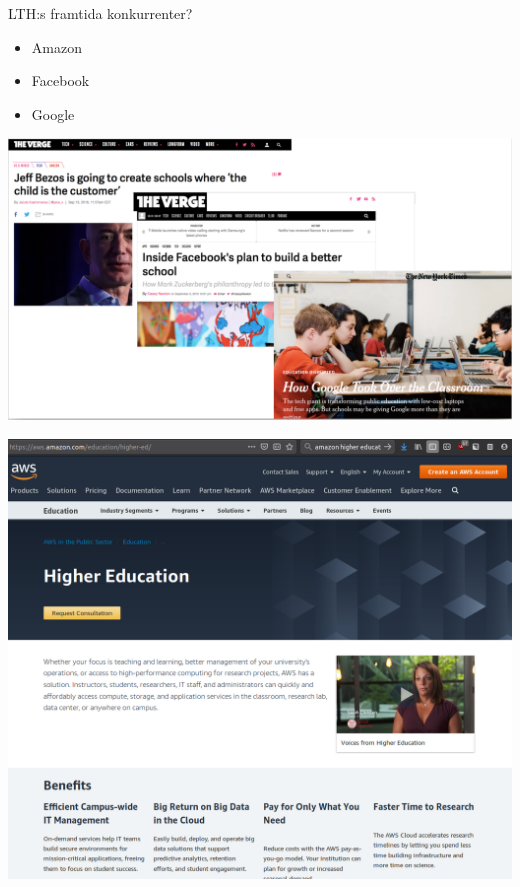 \documentclass[aspectratio=169]{beamer}
\newenvironment{Slide}[1]%
  {\begin{frame}[environment=Slide]{#1}}
  {\end{frame}}%
\begin{document}
\begin{Slide}{LTH:s framtida konkurrenter?}
  \begin{minipage}{0.23\textwidth}
  \begin{itemize}
    \item Amazon
    \item Facebook
    \item Google
  \end{itemize}
  \end{minipage}
  \begin{minipage}{0.7\textwidth}
    \includegraphics[height=0.85\textheight]{../img/afg}
  \end{minipage}
\end{Slide}

\begin{frame}[plain]
\includegraphics[height=1.3\textheight]{../img/aws}
\end{frame}
\end{document}
